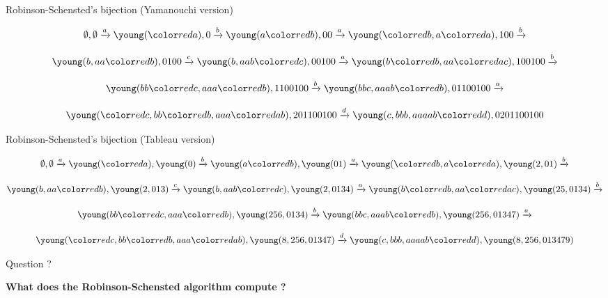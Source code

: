 \documentclass[compress,11pt]{beamer}
\begin{document}
\begin{frame}[fragile]{Robinson-Schensted's bijection (Yamanouchi version)}

  \newcommand{\ra}{{\red a}}%
  \newcommand{\rb}{{\red b}}%
  \newcommand{\rc}{{\red c}}%
  \newcommand{\rd}{{\red d}}%
  \begin{multline*}
  \emptyset,\emptyset \ar{a}
  \young(\ra ),         {\tiny 0}\ar{b}
  \young(a\rb),         00\ar{a}
  \young(\rb,a\ra),     100\ar{b}\\[3mm]
  \young(b,aa\rb),      0100\ar{c}
  \young(b,aab\rc),     00100\ar{a}
  \young(b\rb,aa\ra c), 100100\ar{b}\\[3mm]
  \young(bb\rc,aaa\rb), 1100100\ar{b}
  \young(bbc,aaab\rb),  01100100\ar{a}\\[3mm]
  \young(\rc,bb\rb,aaa\ra b), 201100100\ar{d}
  \young(c,bbb,aaaab\rd), 0201100100
  \end{multline*}
\end{frame}

\begin{frame}[fragile]{Robinson-Schensted's bijection (Tableau version)}

  \newcommand{\ra}{{\red a}}%
  \newcommand{\rb}{{\red b}}%
  \newcommand{\rc}{{\red c}}%
  \newcommand{\rd}{{\red d}}%
  \begin{multline*}
  \emptyset,\emptyset \ar{a}
  \young(\ra ),         \young(0)\ar{b}
  \young(a\rb),         \young(01)\ar{a}
  \young(\rb,a\ra),     \young(2,01)\ar{b}\\[3mm]
  \young(b,aa\rb),      \young(2,013)\ar{c}
  \young(b,aab\rc),     \young(2,0134)\ar{a}
  \young(b\rb,aa\ra c), \young(25,0134)\ar{b}\\[3mm]
  \young(bb\rc,aaa\rb), \young(256,0134)\ar{b}
  \young(bbc,aaab\rb),  \young(256,01347)\ar{a}\\[3mm]
  \young(\rc,bb\rb,aaa\ra b), \young(8,256,01347)\ar{d}
  \young(c,bbb,aaaab\rd), \young(8,256,013479)
  \end{multline*}
\end{frame}

\begin{frame}{Question ?}

  \Huge\bf What does the Robinson-Schensted algorithm compute ?
\end{frame}
\end{document}
